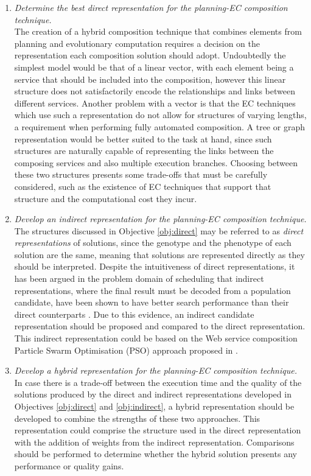 \begin{enumerate}
 \item \label{obj:direct} \textit{Determine the best direct representation for the planning-EC composition technique.}\\
 The creation of a hybrid composition technique that combines elements from planning and evolutionary computation requires a decision on the representation each composition solution should adopt. Undoubtedly the simplest model would be that of a linear vector, with each element being a service that should be included into the composition, however this linear structure does not satisfactorily encode the relationships and links between different services. Another problem with a vector is that the EC techniques which use such a representation do not allow for structures of varying lengths, a requirement when performing fully automated composition. A tree or graph representation would be better suited to the task at hand, since such structures are naturally capable of representing the links between the composing services and also multiple execution branches. Choosing between these two structures presents some trade-offs that must be carefully considered, such as the existence of EC techniques that support that structure and the computational cost they incur.
 
 \item \label{obj:indirect} \textit{Develop an indirect representation for the planning-EC composition technique.}\\
 The structures discussed in Objective \ref{obj:direct} may be referred to as \textit{direct representations} of solutions, since the genotype and the phenotype of each solution are the same, meaning that solutions are represented directly as they should be interpreted. Despite the intuitiveness of direct representations, it has been argued in the problem domain of scheduling that indirect representations, where the final result must be decoded from a population candidate, have been shown to have better search performance than their direct counterparts \cite{hart2005evolutionary}. Due to this evidence, an indirect candidate representation should be proposed and compared to the direct representation. This indirect representation could be based on the Web service composition Particle Swarm Optimisation (PSO) approach proposed in \cite{da2014graph}.
 
 \item \label{obj:hybrid} \textit{Develop a hybrid representation for the planning-EC composition technique.}\\
 In case there is a trade-off between the execution time and the quality of the solutions produced by the direct and indirect representations developed in Objectives \ref{obj:direct} and \ref{obj:indirect}, a hybrid representation should be developed to combine the strengths of these two approaches. This representation could comprise the structure used in the direct representation with the addition of weights from the indirect representation. Comparisons should be performed to determine whether the hybrid solution presents any performance or quality gains.
 

\end{enumerate}
